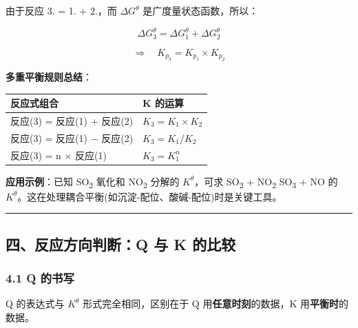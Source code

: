 由于反应 3. = 1. + 2.，而 \(\Delta G^\theta\) 是广度量状态函数，所以：

\[
\Delta G_3^\theta = \Delta G_1^\theta + \Delta G_2^\theta
\]

\[
\Rightarrow \quad \boxed{K_{p_3} = K_{p_1} \times K_{p_2}}
\]

\textbf{多重平衡规则总结}：

{\def\LTcaptype{none} %
\begin{longtable}[]{@{}ll@{}}
\toprule\noalign{}
反应式组合 & K 的运算 \\
\midrule\noalign{}
\endhead
\bottomrule\noalign{}
\endlastfoot
反应(3) = 反应(1) + 反应(2) & \(K_3 = K_1 \times K_2\) \\
反应(3) = 反应(1) − 反应(2) & \(K_3 = K_1 / K_2\) \\
反应(3) = n × 反应(1) & \(K_3 = K_1^n\) \\
\end{longtable}
}

\textbf{应用示例}：已知 SO\textsubscript{2} 氧化和 NO\textsubscript{2} 分解的 \(K^\theta\)，可求 SO\textsubscript{2} + NO\textsubscript{2} \箭 SO\textsubscript{3} + NO 的 \(K^\theta\)。这在处理耦合平衡(如沉淀-配位、酸碱-配位)时是关键工具。

\begin{center}\rule{0.5\linewidth}{0.5pt}\end{center}

\subsection{四、反应方向判断：Q 与 K 的比较}\label{ux56dbux53cdux5e94ux65b9ux5411ux5224ux65adq-ux4e0e-k-ux7684ux6bd4ux8f83}

\subsubsection{4.1 Q 的书写}\label{q-ux7684ux4e66ux5199}

Q 的表达式与 \(K^\theta\) 形式完全相同，区别在于 Q 用\textbf{任意时刻}的数据，K 用\textbf{平衡时}的数据。

